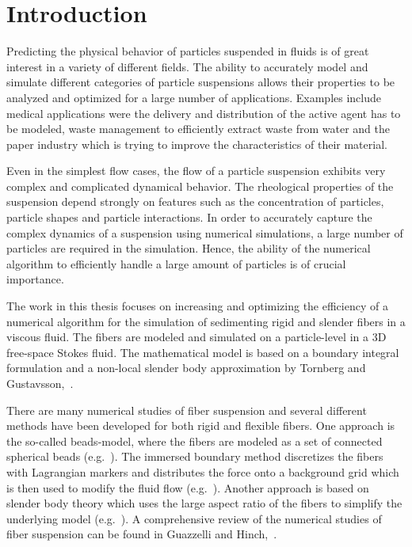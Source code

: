\chapter{Introduction}

Predicting the physical behavior of particles suspended in fluids is of great interest in a variety of different fields. The ability to accurately model and simulate different categories of particle suspensions allows their properties to be analyzed and optimized for a large number of applications. Examples include medical applications were the delivery and distribution of the active agent has to be modeled, waste management to efficiently extract waste from water and the paper industry which is trying to improve the characteristics of their material.

Even in the simplest flow cases, the flow of a particle suspension exhibits very complex and complicated dynamical behavior. The rheological properties of the suspension depend strongly on features such as the concentration of particles, particle shapes and particle interactions. In order to accurately capture the complex dynamics of a suspension using numerical simulations, a large number of particles are required in the simulation. Hence, the ability of the numerical algorithm to efficiently handle a large amount of particles is of crucial importance.

The work in this thesis focuses on increasing and optimizing the efficiency of a numerical algorithm for the simulation of sedimenting rigid and slender fibers in a viscous fluid. The fibers are modeled and simulated on a particle-level in a 3D free-space Stokes fluid. The mathematical model is based on a boundary integral formulation and a non-local slender body approximation by Tornberg and Gustavsson,~\cite{Tornberg2006}.

There are many numerical studies of fiber suspension and several different methods have been developed for both rigid and flexible fibers. One approach is the so-called beads-model, where the fibers are modeled as a set of connected spherical beads (e.g.~\cite{Fan1998}\cite{Joung2001}\cite{Skjetne1997}\cite{Yamamoto1995}). The immersed boundary method discretizes the fibers with Lagrangian markers and distributes the force onto a background grid which is then used to modify the fluid flow (e.g.~\cite{Peskin2002}\cite{Stockie1998}). Another approach is based on slender body theory which uses the large aspect ratio of the fibers to simplify the underlying model (e.g.~\cite{Gustavsson2009}\cite{Tornberg2006}\cite{Tornberg2004}). A comprehensive review of the numerical studies of fiber suspension can be found in Guazzelli and Hinch,~\cite{Guazzelli2011}.

